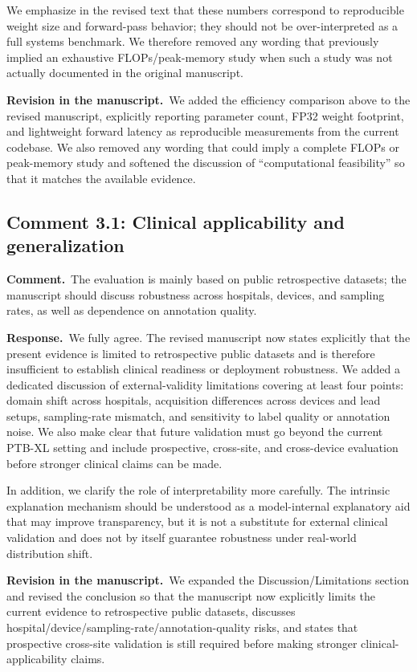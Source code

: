\documentclass[11pt]{article}
\newcommand{\commentheader}{\textbf{Comment.}}
\newcommand{\responseheader}{\textbf{Response.}}
\newcommand{\revisionheader}{\textbf{Revision in the manuscript.}}
\begin{document}
We emphasize in the revised text that these numbers correspond to reproducible weight size and forward-pass behavior; they should not be over-interpreted as a full systems benchmark. We therefore removed any wording that previously implied an exhaustive FLOPs/peak-memory study when such a study was not actually documented in the original manuscript.

\revisionheader\ We added the efficiency comparison above to the revised manuscript, explicitly reporting parameter count, FP32 weight footprint, and lightweight forward latency as reproducible measurements from the current codebase. We also removed any wording that could imply a complete FLOPs or peak-memory study and softened the discussion of ``computational feasibility'' so that it matches the available evidence.

\subsection*{Comment 3.1: Clinical applicability and generalization}

\commentheader\ The evaluation is mainly based on public retrospective datasets; the manuscript should discuss robustness across hospitals, devices, and sampling rates, as well as dependence on annotation quality.

\responseheader\ We fully agree. The revised manuscript now states explicitly that the present evidence is limited to retrospective public datasets and is therefore insufficient to establish clinical readiness or deployment robustness. We added a dedicated discussion of external-validity limitations covering at least four points: domain shift across hospitals, acquisition differences across devices and lead setups, sampling-rate mismatch, and sensitivity to label quality or annotation noise. We also make clear that future validation must go beyond the current PTB-XL setting and include prospective, cross-site, and cross-device evaluation before stronger clinical claims can be made.

In addition, we clarify the role of interpretability more carefully. The intrinsic explanation mechanism should be understood as a model-internal explanatory aid that may improve transparency, but it is not a substitute for external clinical validation and does not by itself guarantee robustness under real-world distribution shift.

\revisionheader\ We expanded the Discussion/Limitations section and revised the conclusion so that the manuscript now explicitly limits the current evidence to retrospective public datasets, discusses hospital/device/sampling-rate/annotation-quality risks, and states that prospective cross-site validation is still required before making stronger clinical-applicability claims.
\end{document}
